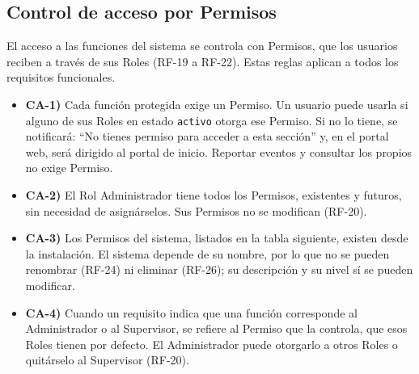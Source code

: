 
\subsection*{Control de acceso por Permisos}
El acceso a las funciones del sistema se controla con Permisos, que los usuarios reciben a trav\'es de sus Roles (RF-19 a RF-22). Estas reglas aplican a todos los requisitos funcionales.

\begin{itemize}[label={}, leftmargin=1.5em]
  \item \textbf{CA-1)} Cada funci\'on protegida exige un Permiso. Un usuario puede usarla si alguno de sus Roles en estado \texttt{activo} otorga ese Permiso. Si no lo tiene, se notificar\'a: ``No tienes permiso para acceder a esta secci\'on'' y, en el portal web, ser\'a dirigido al portal de inicio. Reportar eventos y consultar los propios no exige Permiso.
  \item \textbf{CA-2)} El Rol Administrador tiene todos los Permisos, existentes y futuros, sin necesidad de asign\'arselos. Sus Permisos no se modifican (RF-20).
  \item \textbf{CA-3)} Los Permisos del sistema, listados en la tabla siguiente, existen desde la instalaci\'on. El sistema depende de su nombre, por lo que no se pueden renombrar (RF-24) ni eliminar (RF-26); su descripci\'on y su nivel s\'i se pueden modificar.
  \item \textbf{CA-4)} Cuando un requisito indica que una funci\'on corresponde al Administrador o al Supervisor, se refiere al Permiso que la controla, que esos Roles tienen por defecto. El Administrador puede otorgarlo a otros Roles o quit\'arselo al Supervisor (RF-20).
\end{itemize}

